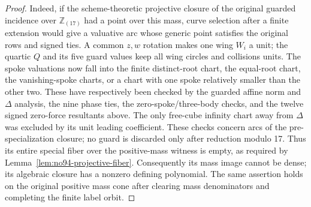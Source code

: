 \documentclass[11pt]{amsart}
\theoremstyle{remark}
\begin{document}
\begin{proof}
Indeed, if the scheme-theoretic projective closure of the original guarded incidence over $\mathbb Z_{(17)}$ had a point over this mass, curve selection after a finite extension would give a valuative arc whose generic point satisfies the original rows and signed ties. A common $z,w$ rotation makes one wing $W_i$ a unit; the quartic $Q$ and its five guard values keep all wing circles and collisions units. The spoke valuations now fall into the finite distinct-root chart, the equal-root chart, the vanishing-spoke charts, or a chart with one spoke relatively smaller than the other two. These have respectively been checked by the guarded affine norm and $\Delta$ analysis, the nine phase ties, the zero-spoke/three-body checks, and the twelve signed zero-force resultants above. The only free-cube infinity chart away from $\Delta$ was excluded by its unit leading coefficient. These checks concern arcs of the pre-specialization closure; no guard is discarded only after reduction modulo 17. Thus its entire special fiber over the positive-mass witness is empty, as required by Lemma~\ref{lem:no94-projective-fiber}. Consequently its mass image cannot be dense; its algebraic closure has a nonzero defining polynomial. The same assertion holds on the original positive mass cone after clearing mass denominators and completing the finite label orbit.
\end{proof}
\end{document}
